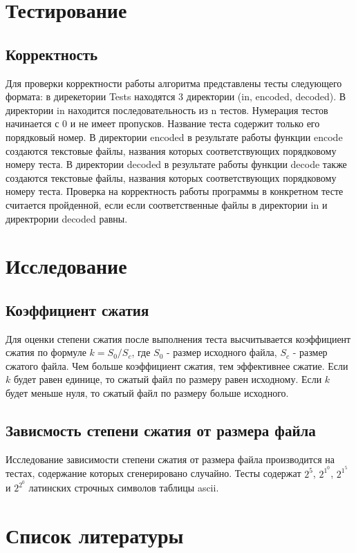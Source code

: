 \documentclass[a4paper]{article}
\begin{document}
\section{Тестирование}
\subsection{Корректность}
Для проверки корректности работы алгоритма представлены тесты следующего формата: в дирекетории Tests находятся 3 директории (in, encoded, decoded). В директории in находится последовательность из n тестов. Нумерация тестов начинается с 0 и не имеет пропусков. Название теста содержит только его порядковый номер. В директории encoded в результате работы функции encode создаются текстовые файлы, названия которых соответствующих порядковому номеру теста. В директории decoded в результате работы функции decode также создаются текстовые файлы, названия которых соответствующих порядковому номеру теста. Проверка на корректность работы программы в конкретном тесте считается пройденной, если если соответственные файлы в директории in и директрории decoded равны.

\newpage
\section{Исследование}
\subsection{Коэффициент сжатия}
Для оценки степени сжатия после выполнения теста высчитывается коэффициент сжатия по формуле $k = S_0 / S_c$, где $S_0$ - размер исходного файла, $S_c$ - размер сжатого файла. Чем больше коэффициент сжатия, тем эффективнее сжатие. Если $k$ будет равен единице, то сжатый файл по размеру равен исходному. Если $k$ будет меньше нуля, то сжатый файл по размеру больше исходного.
\subsection{Зависмость степени сжатия от размера файла}
Исследование зависимости степени сжатия от размера файла производится на тестах, содержание которых сгенерировано случайно. Тесты содержат $2^5$, $2^1^0$, $2^1^5$ и $2^2^0$ латинских строчных символов таблицы ascii.

\newpage
\section{Список литературы}
\end{document}
